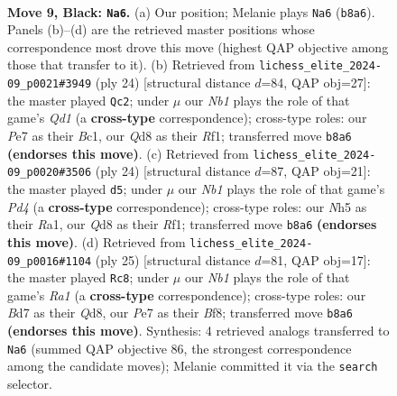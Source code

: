 \documentclass[11pt]{article}
\begin{document}
\clearpage

\begin{figure}[p]\centering
\begin{subfigure}{0.46\textwidth}\centering
\resizebox{\linewidth}{!}{%
\newchessgame
\chessboard[
  setfen={rn1qk2r/pp1bppbp/3p2p1/7n/3NP3/2N1BP2/PPPQ2PP/2KR1B1R b kq - 4 9},
  showmover=false,
  pgfstyle=straightmove, color=movearrow, markmove={b8-a6}
]}
\caption{}
\end{subfigure}\hfill
\begin{subfigure}{0.46\textwidth}\centering
\resizebox{\linewidth}{!}{%
\newchessgame
\chessboard[
  setfen={r1bqrbk1/ppp2ppp/3p1nn1/8/2PP4/3B1NNP/PP3PP1/R1BQ1RK1 w - - 1 13},
  showmover=false,
  pgfstyle=straightmove, color=movearrow, markmove={d1-c2}
]}
\caption{}
\end{subfigure}
\\[4pt]
\begin{subfigure}{0.46\textwidth}\centering
\resizebox{\linewidth}{!}{%
\newchessgame
\chessboard[
  setfen={r2qrbk1/pbpn1ppp/1p1p1n2/8/2PP4/3B1NNP/PP3PP1/R1BQ1RK1 w - - 1 13},
  showmover=false,
  pgfstyle=straightmove, color=movearrow, markmove={d4-d5}
]}
\caption{}
\end{subfigure}\hfill
\begin{subfigure}{0.46\textwidth}\centering
\resizebox{\linewidth}{!}{%
\newchessgame
\chessboard[
  setfen={r2qkb1r/1p1n1p2/p2pb1p1/3Np2p/4P3/2NQ3P/PPP2PP1/2KR1B1R b kq - 1 13},
  showmover=false,
  pgfstyle=straightmove, color=movearrow, markmove={a8-c8}
]}
\caption{}
\end{subfigure}
\caption{\textbf{Move 9, Black: \texttt{Na6}.} (a) Our position; Melanie plays \texttt{Na6} (\texttt{b8a6}). Panels (b)--(d) are the retrieved master positions whose correspondence most drove this move (highest QAP objective among those that transfer to it). (b) Retrieved from \texttt{lichess\_elite\_2024-09\_p0021\#3949} (ply 24) [structural distance $d$=84, QAP obj=27]: the master played \texttt{Qc2}; under $\mu$ our \emph{Nb1} plays the role of that game's \emph{Qd1} (a \textbf{cross-type} correspondence); cross-type roles: our \emph{P}e7 as their \emph{B}c1, our \emph{Q}d8 as their \emph{R}f1; transferred move \texttt{b8a6} \textbf{(endorses this move)}. (c) Retrieved from \texttt{lichess\_elite\_2024-09\_p0020\#3506} (ply 24) [structural distance $d$=87, QAP obj=21]: the master played \texttt{d5}; under $\mu$ our \emph{Nb1} plays the role of that game's \emph{Pd4} (a \textbf{cross-type} correspondence); cross-type roles: our \emph{N}h5 as their \emph{R}a1, our \emph{Q}d8 as their \emph{R}f1; transferred move \texttt{b8a6} \textbf{(endorses this move)}. (d) Retrieved from \texttt{lichess\_elite\_2024-09\_p0016\#1104} (ply 25) [structural distance $d$=81, QAP obj=17]: the master played \texttt{Rc8}; under $\mu$ our \emph{Nb1} plays the role of that game's \emph{Ra1} (a \textbf{cross-type} correspondence); cross-type roles: our \emph{B}d7 as their \emph{Q}d8, our \emph{P}e7 as their \emph{B}f8; transferred move \texttt{b8a6} \textbf{(endorses this move)}. Synthesis: 4 retrieved analogs transferred to \texttt{Na6} (summed QAP objective 86, the strongest correspondence among the candidate moves); Melanie committed it via the \texttt{search} selector.}

\end{figure}
\end{document}
